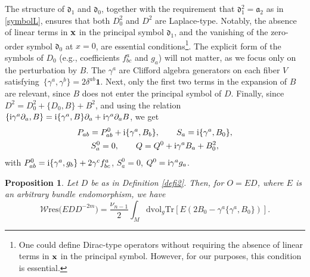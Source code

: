 \documentclass[10pt,a4paper]{amsart}
\numberwithin{equation}{section}
\newtheorem{Proposition}[Theorem]{Proposition}
\theoremstyle{definition}
\def\W{\mathscr{W} \mathrm{res}}
\def\Tr{\mathrm{Tr}}
\def\dv{\mathrm{dvol}_g}
\begin{document}
The structure of $\mathfrak{d}_1$ and $\mathfrak{d}_0$, together with the requirement that $\mathfrak{d}_1^2 = \mathfrak{a}_2$ as in \eqref{symbolL}, ensures that both $D_0^2$ and $D^2$ are Laplace-type. Notably, the absence of linear terms in ${\bf x}$ in the principal symbol $\mathfrak{d}_1$, and the vanishing of the zero-order symbol $\mathfrak{d}_0$ at $x=0$, are essential conditions\footnote{One could define Dirac-type operators without requiring the absence of linear terms in ${\bf x}$ in the principal symbol. However, for our purposes, this condition is essential.}. The explicit form of the symbols of $D_0$ (e.g., coefficients $f^a_{bc}$ and $g_a$) will not matter, as we focus only on the perturbation by $B$. The $\gamma^a$ are Clifford algebra generators on each fiber $V$ satisfying~${\bigl\{\gamma^a,\gamma^b\bigr\} = 2\delta^{ab}\mathbf{1}}$. Next, only the first two terms in the expansion of $B$ are relevant, since $B$ does not enter the principal symbol of $D$. Finally, since $D^2=D_0^2+\{D_0, B\}+B^2$, and using the relation $\{{\rm i}\gamma^a \partial_a, B\} = {\rm i}\{\gamma^a, B\} \partial_a + {\rm i}\gamma^a \partial_a B$, we get
	\begin{gather}
			 P_{ab} = P_{ab}^0 + {\rm i}\{\gamma^a, B_b\}, \qquad S_a = {\rm i}\{\gamma^a, B_0\}, \nonumber\\
			 S_a^0 = 0, \qquad Q = Q^0 + {\rm i}\gamma^a B_a + B_0^2,\label{eq:PSQ}
	\end{gather}
 with $P^0_{ab}={\rm i}\{\gamma^a,g_b\}+2\gamma^cf^a_{bc}$,
$S_a^0=0$, $ Q^0={\rm i}\gamma^ag_a$.
\begin{Proposition}
	\label{lemma:ED}
	Let $D$ be as in Definition {\rm\ref{defi2}}. Then, for $O = ED$, where $E$ is an arbitrary bundle endomorphism, we have
	\[%
			\W\bigl(EDD^{-2m}\bigr)=
			\frac{\nu_{n-1}}{2}\int_M \dv \Tr\left[ E(2B_0-\gamma^a\{\gamma^a,B_0\}) \right].
		\]
\end{Proposition}
\end{document}
